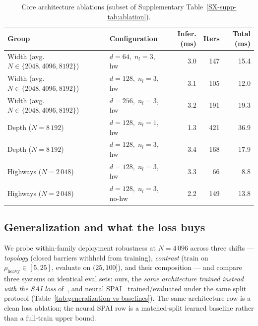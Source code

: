 \documentclass[acmtog]{acmart}
\theoremstyle{plain}
\begin{document}
\begin{table}[t]
\centering
\caption{Core architecture ablations (subset of Supplementary
Table~\ref{SX-supp-tab:ablation}).}
\label{tab:ablation-core}
\scriptsize\setlength{\tabcolsep}{3pt}
\begin{tabular}{@{}l l rr r@{}}
\toprule
Group & Configuration & Infer. (ms) & Iters & Total (ms) \\
\midrule
Width (avg.\ $N\!\in\!\{2048,4096,8192\}$)
  & $d{=}64,\;n_l{=}3$, hw   & 3.0 & 147 & 15.4 \\
Width (avg.\ $N\!\in\!\{2048,4096,8192\}$)
  & $d{=}128,\;n_l{=}3$, hw  & 3.1 & 105 & 12.0 \\
Width (avg.\ $N\!\in\!\{2048,4096,8192\}$)
  & $d{=}256,\;n_l{=}3$, hw  & 3.2 & 191 & 19.3 \\
\midrule
Depth ($N\!=\!8\,192$)
  & $d{=}128,\;n_l{=}1$, hw  & 1.3 & 421 & 36.9 \\
Depth ($N\!=\!8\,192$)
  & $d{=}128,\;n_l{=}3$, hw  & 3.4 & 168 & 17.9 \\
\midrule
Highways ($N\!=\!2\,048$)
  & $d{=}128,\;n_l{=}3$, hw      & 3.3 & 66  & 8.8 \\
Highways ($N\!=\!2\,048$)
  & $d{=}128,\;n_l{=}3$, no-hw   & 2.2 & 149 & 13.8 \\
\bottomrule
\end{tabular}
\end{table}

\subsection{Generalization and what the loss buys}
\label{sec:results:generalization}
We probe within-family deployment robustness at $N\!=\!4\,096$ across three
shifts --- \emph{topology} (closed barriers withheld from training),
\emph{contrast} (train on $\rho_{\text{heavy}}\!\in\![5,25]$, evaluate on
$(25,100]$), and their composition --- and compare three systems on identical
eval sets: ours, the \emph{same architecture trained instead with the SAI loss}
of~\cite{Yang2025sparse}, and neural SPAI~\cite{Yang2025sparse} trained/evaluated
under the same split protocol (Table~\ref{tab:generalization-vs-baselines}). The
same-architecture row is a clean loss ablation; the neural SPAI row is a matched-split
learned baseline rather than a full-train upper bound.
\end{document}
